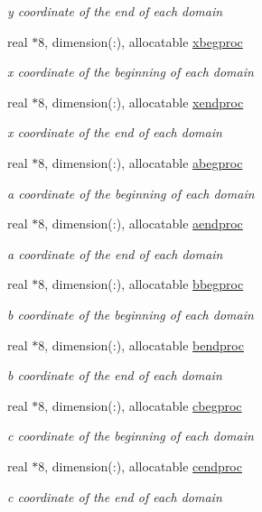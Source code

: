 \begin{DoxyCompactItemize}
\begin{DoxyCompactList}\small\item\em y coordinate of the end of each domain \end{DoxyCompactList}\item 
real $\ast$8, dimension(\-:), allocatable \hyperlink{classdomdec_acf6c7964e86a91e7727f69aa2e00df61}{xbegproc}
\begin{DoxyCompactList}\small\item\em x coordinate of the beginning of each domain \end{DoxyCompactList}\item 
real $\ast$8, dimension(\-:), allocatable \hyperlink{classdomdec_a2a7289d6a16677c917c732f0eddf76f1}{xendproc}
\begin{DoxyCompactList}\small\item\em x coordinate of the end of each domain \end{DoxyCompactList}\item 
real $\ast$8, dimension(\-:), allocatable \hyperlink{classdomdec_a46373c0f7de529f851998ff815e9668b}{abegproc}
\begin{DoxyCompactList}\small\item\em a coordinate of the beginning of each domain \end{DoxyCompactList}\item 
real $\ast$8, dimension(\-:), allocatable \hyperlink{classdomdec_a2ea87a3cfae5a30a0bc8c6bfc5df1d3d}{aendproc}
\begin{DoxyCompactList}\small\item\em a coordinate of the end of each domain \end{DoxyCompactList}\item 
real $\ast$8, dimension(\-:), allocatable \hyperlink{classdomdec_aef7dcbfb9b97d34a3a5120ef84a43202}{bbegproc}
\begin{DoxyCompactList}\small\item\em b coordinate of the beginning of each domain \end{DoxyCompactList}\item 
real $\ast$8, dimension(\-:), allocatable \hyperlink{classdomdec_a91b8366b4147ad59a1bb1f2f3ac2b193}{bendproc}
\begin{DoxyCompactList}\small\item\em b coordinate of the end of each domain \end{DoxyCompactList}\item 
real $\ast$8, dimension(\-:), allocatable \hyperlink{classdomdec_a2e88f8020b2ae7a7a37fded2d39153a3}{cbegproc}
\begin{DoxyCompactList}\small\item\em c coordinate of the beginning of each domain \end{DoxyCompactList}\item 
real $\ast$8, dimension(\-:), allocatable \hyperlink{classdomdec_a50ae6442cb7d2c0f772f728601e5efbc}{cendproc}
\begin{DoxyCompactList}\small\item\em c coordinate of the end of each domain \end{DoxyCompactList}\end{DoxyCompactItemize}


